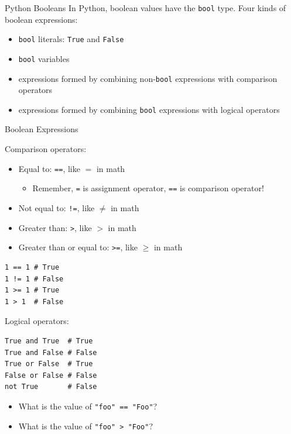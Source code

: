 \documentclass[smaller, aspectratio=1610]{beamer}
\begin{document}
\begin{frame}[label={sec:org29723e7},fragile]{Python Booleans}
 In Python, boolean values have the \texttt{bool} type. Four kinds of boolean
expressions:

\begin{itemize}
\item \texttt{bool} literals: \texttt{True} and \texttt{False}
\item \texttt{bool} variables
\item expressions formed by combining non-\texttt{bool} expressions with comparison operators
\item expressions formed by combining \texttt{bool} expressions with logical operators
\end{itemize}
\end{frame}

\begin{frame}[label={sec:orgd43edae},fragile]{Boolean Expressions}
 \begin{block}{Comparison operators:}
\begin{itemize}
\item Equal to: \texttt{==}, like \(=\) in math

\begin{itemize}
\item Remember, \texttt{=} is assignment operator, \texttt{==} is comparison operator!
\end{itemize}

\item Not equal to: \texttt{!=}, like \(\ne\) in math
\item Greater than: \texttt{>}, like \(>\) in math
\item Greater than or equal to: \texttt{>=}, like \(\ge\) in math
\end{itemize}

\lstset{language=Python,label= ,caption= ,captionpos=b,numbers=none}
\begin{lstlisting}
1 == 1 # True
1 != 1 # False
1 >= 1 # True
1 > 1  # False
\end{lstlisting}
\end{block}

\begin{block}{Logical operators:}
\lstset{language=Python,label= ,caption= ,captionpos=b,numbers=none}
\begin{lstlisting}
True and True  # True
True and False # False
True or False  # True
False or False # False
not True       # False
\end{lstlisting}


\begin{itemize}
\item What is the value of \texttt{"foo" == "Foo"}?
\item What is the value of \texttt{"foo" > "Foo"}?
\end{itemize}
\end{block}
\end{frame}
\end{document}
